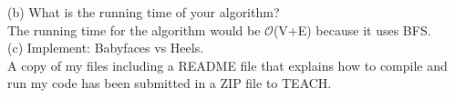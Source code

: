 \documentclass{article}
\begin{document}
\noindent(b) What is the running time of your algorithm?\\
The running time for the algorithm would be $\mathcal{O} $(V+E) because it uses BFS. 
\\[.25cm]

\noindent(c) Implement: Babyfaces vs Heels.\\
A copy of my files including a README file that explains how to compile and run my code has been submitted in a ZIP file to TEACH.


\end{document}
